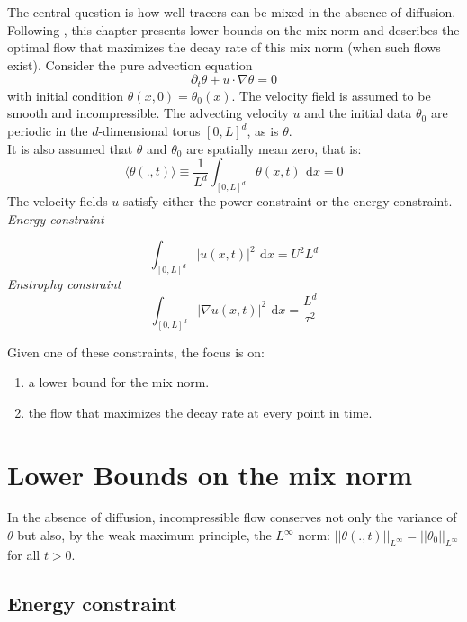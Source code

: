 \documentclass[12pt]{report}   %
\numberwithin{equation}{section}
\theoremstyle{plain}
\theoremstyle{definition}
\theoremstyle{remark}
\newcommand{\rmd}{\, \mathrm{d}}
\begin{document}
The central question is how well tracers can be mixed in the absence of diffusion. Following \cite{IyerKiselevEA14}, this chapter presents lower bounds on the mix norm and describes the optimal flow that maximizes the decay rate of this mix norm (when such flows exist).
Consider the pure advection equation
\begin{equation}
\partial_t\theta + u\cdot\nabla\theta = 0     \label{eq:1}
\end{equation}
with initial condition $\theta(x,0) = \theta_0(x)$. The velocity field is assumed to be smooth and incompressible. The advecting velocity $u$ and the initial data $\theta_0$ are periodic in the $d$-dimensional torus $[0,L]^d$, as is $\theta$. \\
It is also assumed that $\theta$ and $\theta_0$ are spatially mean zero, that is:
\begin{equation}
\langle\theta(.,t)\rangle   \equiv \frac{1}{L^d}\int_{[0,L]^d}\theta(x,t)~\rmd x = 0 \label{eq:2} 
\end{equation}
 The velocity fields $u$ satisfy either the power constraint or the energy constraint. \\
\vspace{0.2cm}
\textit{Energy constraint}

\begin{equation}
\int_{[0,L]^d}|u(x,t)|^2 ~\rmd x = U^2L^d \label{eq:3}
\end{equation} 
\textit{Enstrophy constraint} \\
\begin{equation}
\int_{[0,L]^d}|\nabla u(x,t)|^2 ~\rmd x = \frac{L^d}{\tau^2} \label{eq:4}
\end{equation}
 
Given one of these constraints, the focus is on:
\begin{enumerate}
\item a lower bound for the mix norm.
\item the flow that maximizes the decay rate at every point in time.
\end{enumerate}

\section{Lower Bounds on the mix norm}
In the absence of diffusion, incompressible flow conserves not only the variance of $\theta$ but also, by the weak maximum principle, the $L^\infty$ norm: $||\theta(.,t)||_{L^\infty} = ||\theta_0||_{L^\infty}$ for all $t > 0$. 
\subsection{Energy constraint} 
\end{document}
